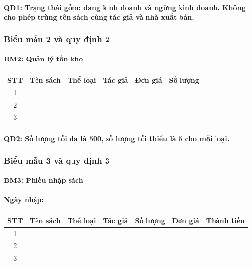 \documentclass[12pt]{report}
\begin{document}
                \paragraph{QĐ1: Trạng thái gồm: đang kinh doanh và ngừng kinh doanh. Không cho phép trùng tên sách cùng tác giả và nhà xuất bản.}
            \subsubsection{Biểu mẫu 2 và quy định 2}
                \paragraph{BM2: Quản lý tồn kho }
                \begin{tabular}{|c|c|c|c|c|c|}
                    \hline
                    \textbf{STT} & \textbf{Tên sách} & 
                    \textbf{Thể loại} & \textbf{Tác giả} &
                    \textbf{Đơn giá} & \textbf{Số lượng} \\ \hline
                    1 & & & & & \\ \hline
                    2 & & & & & \\ \hline
                    3 & & & & & \\ \hline
                \end{tabular}
                \paragraph{QĐ2: Số lượng tối đa là \textbf{500}, số lượng tối thiểu là \textbf{5} cho mỗi loại.}
            \subsubsection{Biểu mẫu 3 và quy định 3}
                \paragraph{BM3: Phiếu nhập sách}
                \paragraph{Ngày nhập:}
                \begin{tabular}{|c|c|c|c|c|c|c|}
                    \hline
                    \textbf{STT} & \textbf{Tên sách} & 
                    \textbf{Thể loại} & \textbf{Tác giả} & \textbf{Số lượng} &
                    \textbf{Đơn giá} & \textbf{Thành tiền} \\ \hline
                    1 & & & & & & \\ \hline
                    2 & & & & & & \\ \hline
                    3 & & & & & & \\ \hline
                \end{tabular}
\end{document}
